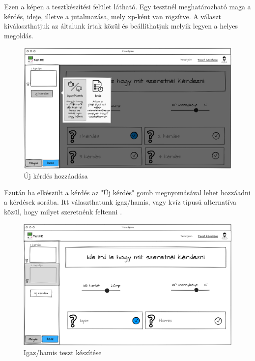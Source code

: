 Ezen a képen  a tesztkészítési felület látható. Egy tesztnél meghatározható maga a kérdés, ideje, illetve a jutalmazása, mely xp-ként van rögzítve. A választ kiválaszthatjuk az általunk írtak közül és beállíthatjuk melyik legyen a helyes megoldás.

\begin{figure}[H]
    \centering
    \includegraphics[width=\linewidth]{images/make_test2_wireframe.png}
    \caption{Új kérdés hozzáadása}
    \label{fig:new_question}
\end{figure}

Ezután ha elkészült a kérdés az "Új kérdés" gomb megnyomásával lehet hozzáadni a kérdések sorába. Itt választhatunk igaz/hamis, vagy kvíz típusú alternatíva közül, hogy milyet szeretnénk feltenni .

\begin{figure}[H]
    \centering
    \includegraphics[width=\linewidth]{images/make_test3_wireframe.png}
    \caption{Igaz/hamis teszt készítése}
    \label{fig:test_true_false}
\end{figure}

